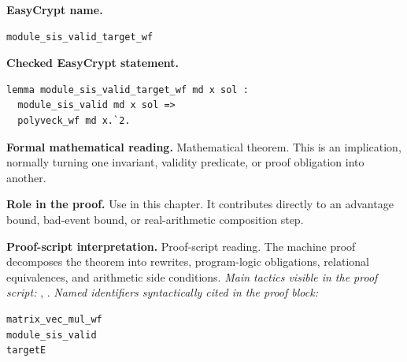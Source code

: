 \begin{formaltheorem}
\noindent\textbf{EasyCrypt name.}
\begin{lstlisting}[language=EasyCrypt,basicstyle=\ttfamily\scriptsize]
module_sis_valid_target_wf
\end{lstlisting}
\noindent\textbf{Checked EasyCrypt statement.}
\begin{lstlisting}[language=EasyCrypt,basicstyle=\ttfamily\scriptsize]
lemma module_sis_valid_target_wf md x sol :
  module_sis_valid md x sol =>
  polyveck_wf md x.`2.
\end{lstlisting}
\noindent\textbf{Formal mathematical reading.}
Mathematical theorem. This is an implication, normally turning one invariant, validity predicate, or proof obligation into another.

\noindent\textbf{Role in the proof.}
Use in this chapter. It contributes directly to an advantage bound, bad-event bound, or real-arithmetic composition step.

\noindent\textbf{Proof-script interpretation.}
Proof-script reading. The machine proof decomposes the theorem into rewrites, program-logic obligations, relational equivalences, and arithmetic side conditions.
\emph{Main tactics visible in the proof script:} , .
\emph{Named identifiers syntactically cited in the proof block:}
\begin{lstlisting}[language=EasyCrypt,basicstyle=\ttfamily\scriptsize]
matrix_vec_mul_wf
module_sis_valid
targetE
\end{lstlisting}

\end{formaltheorem}

